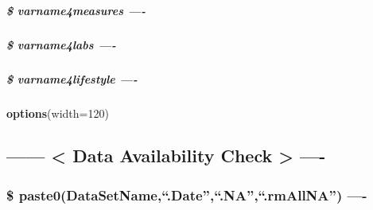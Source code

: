 \documentclass[
]{article}
\newenvironment{Shaded}{\begin{snugshade}}{\end{snugshade}}
\newcommand{\AttributeTok}[1]{\textcolor[rgb]{0.13,0.29,0.53}{#1}}
\newcommand{\DecValTok}[1]{\textcolor[rgb]{0.00,0.00,0.81}{#1}}
\newcommand{\FunctionTok}[1]{\textcolor[rgb]{0.13,0.29,0.53}{\textbf{#1}}}
\newcommand{\NormalTok}[1]{#1}
\begin{document}
\hypertarget{varname4measures--}{%
\subparagraph{\$ varname4measures ----}\label{varname4measures--}}

\hypertarget{varname4labs--}{%
\subparagraph{\$ varname4labs ----}\label{varname4labs--}}

\hypertarget{varname4lifestyle--}{%
\subparagraph{\$ varname4lifestyle ----}\label{varname4lifestyle--}}

\begin{Shaded}
\begin{Highlighting}[]
\FunctionTok{options}\NormalTok{(}\AttributeTok{width=}\DecValTok{120}\NormalTok{)}
\end{Highlighting}
\end{Shaded}

\hypertarget{data-availability-check--}{%
\subsection{------ \textless{} Data Availability Check \textgreater{}
----}\label{data-availability-check--}}

\hypertarget{paste0datasetname.date.na.rmallna--}{%
\subsubsection{\$ paste0(DataSetName,``.Date'',``.NA'',``.rmAllNA'')
----}\label{paste0datasetname.date.na.rmallna--}}
\end{document}
